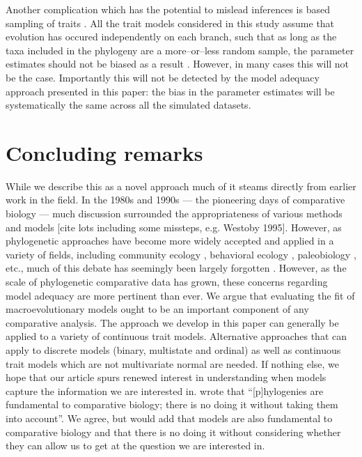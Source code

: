 \documentclass[12pt]{article}
\begin{document}
Another complication which has the potential to mislead inferences is based sampling of traits \citep{Freckletoninaction, longeuroname, FitzJohnwoody}. All the trait models considered in this study assume that evolution has occured independently on each branch, such that as long as the taxa included in the phylogeny are a more--or--less random sample, the parameter estimates should not be biased as a result \citep{PennellHarmon}. However, in many cases \citep[especially when using large trait databases][]{FitzJohnwoody} this will not be the case. Importantly this will not be detected by the model adequacy approach presented in this paper: the bias in the parameter estimates will be systematically the same across all the simulated datasets.



\section{Concluding remarks}

While we describe this as a novel approach much of it steams directly from earlier work in the field. In the 1980s and 1990s --- the pioneering days of comparative biology --- much discussion surrounded the appropriateness of various methods and models [cite lots including some missteps, e.g. Westoby 1995]. However, as phylogenetic approaches have become more widely accepted and applied in a variety of fields, including community ecology \citep{Green1993, AckerlyDonoghue1995, Webb2002, CB2009, PennellHarmon}, behavioral ecology \citep{something}, paleobiology \citep{something else}, etc., much of this debate has seemingly been largely forgotten \citep[but see][]{Losos2010}. However, as the scale of phylogenetic comparative data has grown, these concerns regarding model adequacy are more pertinent than ever. We argue that evaluating the fit of macroevolutionary models ought to be an important component of any comparative analysis. The approach we develop in this paper can generally be applied to a variety of continuous trait models. Alternative approaches that can apply to discrete models (binary, multistate and ordinal) as well as continuous trait models which are not multivariate normal are needed. If nothing else, we hope that our article spurs renewed interest in understanding when models capture the information we are interested in. \citet[][p. 14]{Felsenstein1985} wrote that ``[p]hylogenies are fundamental to comparative biology; there is no doing it without taking them into account''. We agree, but would add that models are also fundamental to comparative biology and that there is no doing it without considering whether they can allow us to get at the question we are interested in.
\end{document}
